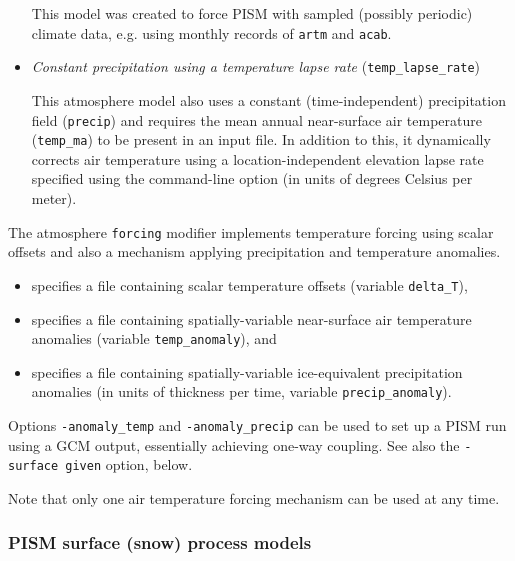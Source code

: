 \begin{itemize}
    This model was created to force PISM with sampled (possibly periodic) climate data, e.g. using monthly records of \texttt{artm} and \texttt{acab}.

  \item \emph{Constant precipitation using a temperature lapse rate} (\texttt{temp_lapse_rate})
    
    This atmosphere model also uses a constant (time-independent) precipitation field (\texttt{precip}) and requires the mean annual near-surface air temperature (\texttt{temp_ma}) to be present in an input file. In addition to this, it dynamically corrects air temperature using a location-independent elevation lapse rate specified using the  command-line option (in units of degrees Celsius per meter).

  \end{itemize}
  
The atmosphere \texttt{forcing} modifier implements temperature forcing using scalar offsets and also a mechanism applying precipitation and temperature anomalies.
  \begin{itemize}
  \item {} specifies a file containing scalar temperature offsets (variable \texttt{delta_T}), 
  \item {} specifies a file containing spatially-variable near-surface air temperature anomalies (variable \texttt{temp_anomaly}), and
  \item {} specifies a file containing spatially-variable ice-equivalent precipitation anomalies (in units of thickness per time, variable \texttt{precip_anomaly}).
  \end{itemize}

  Options \texttt{-anomaly_temp} and \texttt{-anomaly_precip} can be used to set up a PISM run using a GCM output, essentially achieving one-way coupling. See also the \texttt{-surface given} option, below.

  Note that only one air temperature forcing mechanism can be used at any time.  %

\subsubsection{PISM surface (snow) process models}
\label{sec:pism-surface-snow}

